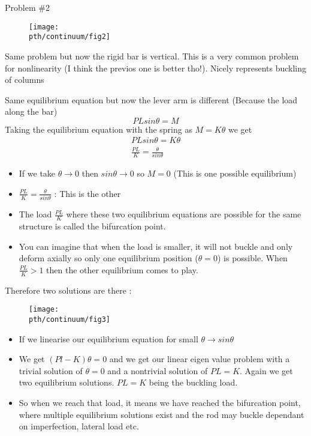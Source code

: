 	\begin{frame}{Problem \#2}
		\begin{figure}
			\centering
			\texttt{[image: \\pth/continuum/fig2]}
			\caption{}
			\label{fig:fig1}
		\end{figure}
		Same problem but now the rigid bar is vertical. This is a very common problem for nonlinearity (I think the previos one is better tho!). Nicely represents buckling of columns
	\end{frame}

	\begin{frame}
		Same equilibrium equation but now the lever arm is different (Because the load along the bar)
		\begin{equation}
		PL sin \theta = M
		\end{equation}
		Taking the equilibrium equation with the spring as $ M = K \theta$ we get
		\begin{align*}
		PL sin \theta = K \theta \\
		\frac{PL}{K} = \frac{\theta}{sin \theta}
		\end{align*}
		\begin{itemize}
			\item If we take $\theta \rightarrow 0$ then $sin \theta \rightarrow 0$ so $M = 0$ (This is one possible equilibrium)
			\item	$\frac{PL}{K} = \frac{\theta}{sin \theta}$ : This is the other
			\item The load $\frac{PL}{K}$ where these two equilibrium equations are possible for the same structure is called the bifurcation point. 
			\item You can imagine that when the load is smaller, it will not buckle and only deform axially so only one equilibrium position ($\theta =0$) is possible. When $\frac{PL}{K}>1$ then the other equilibrium comes to play.
		\end{itemize}
	\end{frame}

	\begin{frame}
		Therefore two solutions  are there :
		\begin{figure}
			\centering
			\texttt{[image: \\pth/continuum/fig3]}
			\label{fig:fig3}
		\end{figure}
		\begin{itemize}
			\item If we linearise our equilibrium equation for small $\theta \rightarrow sin \theta$
			\item We get $(Pl - K)\theta = 0$ and we get our linear eigen value problem with a trivial solution of $\theta = 0$ and a nontrivial solution of $PL = K$. Again we get two equilibrium solutions. $PL = K$ being the buckling load. 
			\item So when we reach that load, it means we have reached the bifurcation point, where multiple equilibrium solutions exist and the rod may buckle dependant on imperfection, lateral load etc. 			
		\end{itemize}
	\end{frame}


